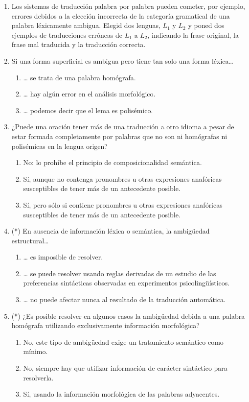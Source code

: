 \begin{enumerate}
\item Los sistemas de traducción palabra por palabra pueden cometer, por ejemplo, errores debidos a la elección incorrecta de la categoría gramatical de una palabra léxicamente ambigua. Elegid dos lenguas, $L_1$ y $L_2$ y poned dos ejemplos de traducciones erróneas de $L_1$ a $L_2$, indicando la frase original, la frase mal traducida y la traducción correcta. 

\item Si una forma superficial es ambigua pero tiene tan solo una forma léxica{\ldots} \begin{enumerate} \item {\ldots} se trata de una palabra homógrafa. \item {\ldots} hay algún error en el análisis morfológico. \item {\ldots} podemos decir que el lema es polisémico. \end{enumerate} 

\item ¿Puede una oración tener más de una traducción a otro idioma a pesar de estar formada completamente por palabras que no son ni homógrafas ni polisémicas en la lengua origen? \begin{enumerate} \item No: lo prohíbe el principio de composicionalidad semántica. \item Sí, aunque no contenga pronombres u otras expresiones anafóricas susceptibles de tener más de un antecedente posible. \item Sí, pero sólo si contiene pronombres u otras expresiones anafóricas susceptibles de tener más de un antecedente posible. \end{enumerate} 

\item (*) En ausencia de información léxica o semántica, la ambigüedad estructural{\ldots} \begin{enumerate} \item {\ldots} es imposible de resolver. \item {\ldots} se puede resolver usando reglas derivadas de un estudio de las preferencias sintácticas observadas en experimentos psicolingüísticos. \item {\ldots} no puede afectar nunca al resultado de la traducción automática. \end{enumerate} 

\item (*) ¿Es posible resolver en algunos casos la ambigüedad debida a una palabra homógrafa utilizando exclusivamente información morfológica? \begin{enumerate} \item No, este tipo de ambigüedad exige un tratamiento semántico como mínimo. \item No, siempre hay que utilizar información de carácter sintáctico para resolverla. \item Sí, usando la información morfológica de las palabras adyacentes. \end{enumerate} 


\end{enumerate}

